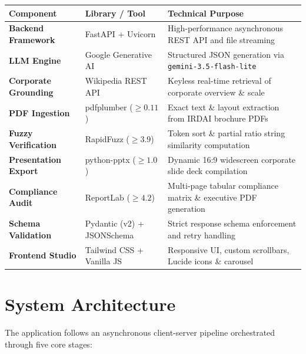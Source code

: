 \documentclass[11pt,a4paper]{article}
\begin{document}
\begin{table}[h!]
\centering
\small
\begin{tabularx}{\textwidth}{@{}l l X@{}}
\toprule
\textbf{Component} & \textbf{Library / Tool} & \textbf{Technical Purpose} \\ \midrule
\textbf{Backend Framework} & FastAPI + Uvicorn & High-performance asynchronous REST API and file streaming \\
\textbf{LLM Engine} & Google Generative AI & Structured JSON generation via \texttt{gemini-3.5-flash-lite} \\
\textbf{Corporate Grounding} & Wikipedia REST API & Keyless real-time retrieval of corporate overview \& scale \\
\textbf{PDF Ingestion} & pdfplumber ($\ge 0.11$) & Exact text \& layout extraction from IRDAI brochure PDFs \\
\textbf{Fuzzy Verification} & RapidFuzz ($\ge 3.9$) & Token sort \& partial ratio string similarity computation \\
\textbf{Presentation Export} & python-pptx ($\ge 1.0$) & Dynamic 16:9 widescreen corporate slide deck compilation \\
\textbf{Compliance Audit} & ReportLab ($\ge 4.2$) & Multi-page tabular compliance matrix \& executive PDF generation \\
\textbf{Schema Validation} & Pydantic (v2) + JSONSchema & Strict response schema enforcement and retry handling \\
\textbf{Frontend Studio} & Tailwind CSS + Vanilla JS & Responsive UI, custom scrollbars, Lucide icons \& carousel \\ \bottomrule
\end{tabularx}
\end{table}

\section{System Architecture}

The application follows an asynchronous client-server pipeline orchestrated through five core stages:
\end{document}
